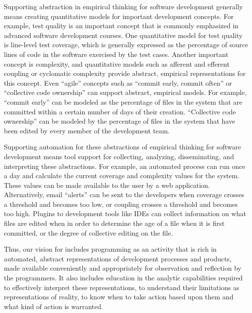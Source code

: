 Supporting abstraction in empirical thinking for software development
generally means creating quantitative models for important development
concepts.  For example, test quality is an important concept that is
commonly emphasized in advanced software development courses.  One
quantitative model for test quality is line-level test coverage, which is
generally expressed as the percentage of source lines of code in the
software exercised by the test cases.  Another important concept is
complexity, and quantitative models such as afferent and efferent coupling
or cyclomatic complexity provide abstract, empirical representations for
this concept.  Even ``agile'' concepts such as ``commit early, commit
often'' or ``collective code ownership'' can support abstract, empirical
models. For example, ``commit early'' can be modeled as the percentage of
files in the system that are committed within a certain number of days of
their creation.  ``Collective code ownership'' can be modeled by the
percentage of files in the system that have been edited by every member of
the development team.

Supporting automation for these abstractions of empirical thinking for
software development means tool support for collecting, analyzing,
disseminating, and interpreting these abstractions.  For example, an
automated process can run once a day and calculate the current coverage and
complexity values for the system.  These values can be made available to
the user by a web application. Alternatively, email ``alerts'' can be sent
to the developers when coverage crosses a threshold and becomes too low, or
coupling crosses a threshold and becomes too high.  Plugins to development
tools like IDEs can collect information on what files are edited when in
order to determine the age of a file when it is first committed, or the
degree of collective editing on the file.  

Thus, our vision for \eCT includes programming as an activity that is rich
in automated, abstract representations of development processes and
products, made available conveniently and appropriately for observation and
reflection by the programmers.  It also includes education in the analytic
capabilities required to effectively interpret these representations, to
understand their limitations as representations of reality, to know when to
take action based upon them and what kind of action is warranted.


